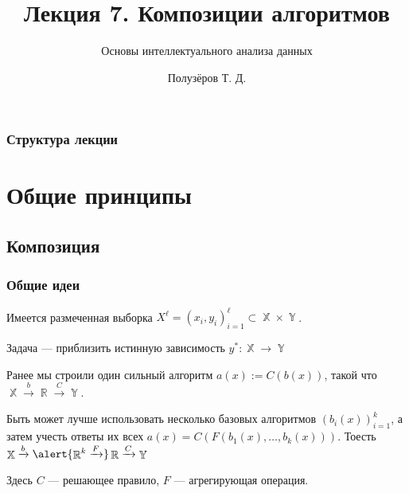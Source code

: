 \documentclass{beamer}
\title[Ансамбли]{Лекция 7. Композиции алгоритмов}
\subtitle{Основы интеллектуального анализа данных}
\author{Полузёров Т. Д.}
\institute{БГУ ФПМИ}
\date{}
\DeclareMathOperator{\R}{\mathbb{R}}
\DeclareMathOperator{\X}{\mathbb{X}}
\DeclareMathOperator{\Y}{\mathbb{Y}}
\begin{document}
	
	\begin{frame}
		\titlepage
	\end{frame}
	
	
	\begin{center}
		\frametitle{Структура лекции}
		\tableofcontents
	\end{center}
	
	\section{Общие принципы}

	\subsection{Композиция}

	\begin{frame}
		\frametitle{Общие идеи}

		Имеется размеченная выборка $X^{\ell} = (x_i, y_i)_{i=1}^{\ell} \subset \X \times \Y$. 
		
		Задача --- приблизить истинную зависимость $y^{*}: \X \rightarrow \Y$

		\vspace{15pt}

		Ранее мы строили один сильный алгоритм $a(x) := C(b(x))$, такой что $\X \xrightarrow{b} \R \xrightarrow{C} \Y$.
		
		\vspace{15pt}

		Быть может лучше использовать несколько базовых алгоритмов $(b_i(x))_{i=1}^{k}$, а затем учесть ответы их всех
		$a(x) = C(F(b_1(x), \dots, b_k(x)))$. Тоесть $\X \xrightarrow{b} \alert{ \R^k \xrightarrow{F}} \R \xrightarrow{C} \Y$

		\vspace{15pt}

		Здесь $C$ --- решающее правило, $F$ --- агрегирующая операция.
	\end{frame}
\end{document}
